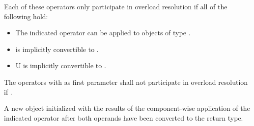 \begin{itemdescr}
  \pnum\remarks Each of these operators only participate in overload resolution if all of the following hold:
  \begin{itemize}
    \item The indicated operator can be applied to objects of type \dataparreturntype{}\code{::}.
    \item \datapar{} is implicitly convertible to \dataparreturntype.
    \item \type U is implicitly convertible to \dataparreturntype.
  \end{itemize}

  \pnum\remarks The operators with  as first parameter shall not participate in overload resolution if .

  \pnum\returns A new \datapar object initialized with the results of the component-wise application of the indicated operator after both operands have been converted to the return type.
\end{itemdescr}

